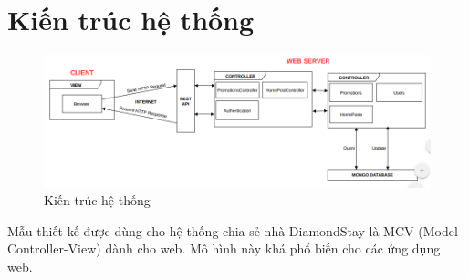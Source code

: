 \newpage 
\section{Kiến trúc hệ thống}
\begin{figure}[H]
	\centering
	\includegraphics[width=14cm]{Image/ar.png}
	\vspace{0.5cm}
	\caption{Kiến trúc hệ thống}
\end{figure}

Mẫu thiết kế được dùng cho hệ thống chia sẻ nhà DiamondStay là MCV (Model-Controller-View) dành cho web. Mô hình này khá phổ biến cho các ứng dụng web.